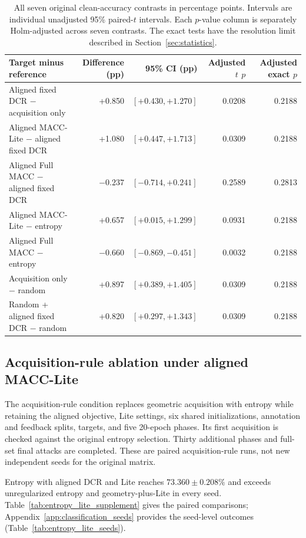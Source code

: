 \documentclass[10pt,a4paper,twocolumn]{article}
\begin{document}
\begin{table}[tbp]
\caption{All seven original clean-accuracy contrasts in percentage
points. Intervals are individual unadjusted 95\% paired-$t$
intervals. Each $p$-value column is separately Holm-adjusted
across seven contrasts. The exact tests have the resolution
limit described in Section~\ref{sec:statistics}.}
\label{tab:planned_contrasts}
\centering\small
\begin{tabularx}{\textwidth}{@{}Yrrrr@{}}
\toprule
Target minus reference & Difference (pp) & 95\% CI (pp) &
Adjusted $t$ $p$ & Adjusted exact $p$ \\
\midrule
Aligned fixed DCR $-$ acquisition only &
+0.850 & $[+0.430,+1.270]$ & 0.0208 & 0.2188 \\
Aligned MACC-Lite $-$ aligned fixed DCR &
+1.080 & $[+0.447,+1.713]$ & 0.0309 & 0.2188 \\
Aligned Full MACC $-$ aligned fixed DCR &
$-0.237$ & $[-0.714,+0.241]$ & 0.2589 & 0.2813 \\
Aligned MACC-Lite $-$ entropy &
+0.657 & $[+0.015,+1.299]$ & 0.0931 & 0.2188 \\
Aligned Full MACC $-$ entropy &
$-0.660$ & $[-0.869,-0.451]$ & 0.0032 & 0.2188 \\
Acquisition only $-$ random &
+0.897 & $[+0.389,+1.405]$ & 0.0309 & 0.2188 \\
Random + aligned fixed DCR $-$ random &
+0.820 & $[+0.297,+1.343]$ & 0.0309 & 0.2188 \\
\bottomrule
\end{tabularx}
\end{table}


\subsection{Acquisition-rule ablation under aligned MACC-Lite}\label{sec:acquisition_results}
\label{sec:entropy_lite}

The acquisition-rule condition replaces geometric acquisition with
entropy while retaining the aligned objective, Lite settings,
six shared initializations, annotation and feedback splits,
targets, and five 20-epoch phases.
Its first acquisition is checked against the original entropy
selection. Thirty additional phases and full-set final attacks
are completed. These are paired acquisition-rule runs,
not new independent seeds for the original matrix.

Entropy with aligned DCR and Lite reaches
$73.360\pm0.208\%$ and exceeds unregularized entropy and
geometry-plus-Lite in every seed.
Table~\ref{tab:entropy_lite_supplement} gives the paired comparisons;
Appendix~\ref{app:classification_seeds} provides the seed-level
outcomes (Table~\ref{tab:entropy_lite_seeds}).
\end{document}
